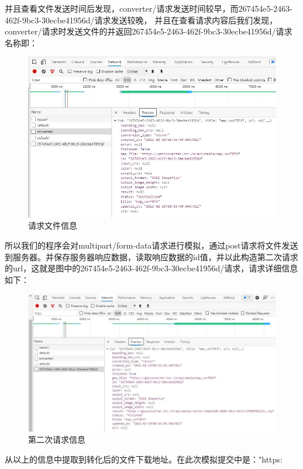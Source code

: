 并且查看文件发送时间后发现，converter/请求发送时间较早，而267454e5-2463-462f-9bc3-30ecbe41956d/请求发送较晚，
并且在查看请求内容后我们发现，converter/请求时发送文件的并返回267454e5-2463-462f-9bc3-30ecbe41956d/请求名称即：\\
\begin{figure}[H]
    \centering
    \includegraphics[width=13cm]{figure/shp_3.jpg}
    \caption{请求文件信息}
    \label{fig-qqwjxx}%
\end{figure}
所以我们的程序会对multipart/form-data请求进行模拟，通过post请求将文件发送到服务器。并保存服务器响应数据，读取响应数据的id值，并以此构造第二次请求的url，这就是图中的267454e5-2463-462f-9bc3-30ecbe41956d/请求，请求详细信息如下：\\
\begin{figure}[H]
    \centering
    \includegraphics[width=13cm]{figure/shp_4.jpg}
    \caption{第二次请求信息}
    \label{fig-drcqqxx}%
\end{figure}
从以上的信息中提取到转化后的文件下载地址。在此次模拟提交中是："https:\\
